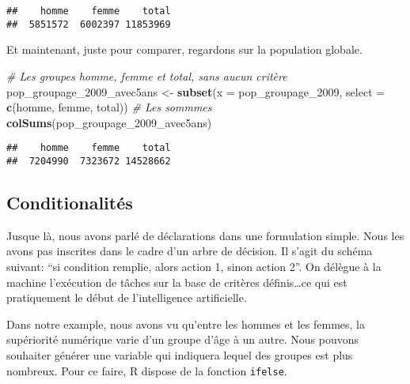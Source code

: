 \documentclass[]{book}
\newenvironment{Shaded}{\begin{snugshade}}{\end{snugshade}}
\newcommand{\KeywordTok}[1]{\textcolor[rgb]{0.13,0.29,0.53}{\textbf{#1}}}
\newcommand{\DataTypeTok}[1]{\textcolor[rgb]{0.13,0.29,0.53}{#1}}
\newcommand{\DecValTok}[1]{\textcolor[rgb]{0.00,0.00,0.81}{#1}}
\newcommand{\StringTok}[1]{\textcolor[rgb]{0.31,0.60,0.02}{#1}}
\newcommand{\CommentTok}[1]{\textcolor[rgb]{0.56,0.35,0.01}{\textit{#1}}}
\newcommand{\OperatorTok}[1]{\textcolor[rgb]{0.81,0.36,0.00}{\textbf{#1}}}
\newcommand{\NormalTok}[1]{#1}
\begin{document}
\begin{verbatim}
##    homme    femme    total 
##  5851572  6002397 11853969
\end{verbatim}

Et maintenant, juste pour comparer, regardons sur la population globale.

\begin{Shaded}
\begin{Highlighting}[]
\CommentTok{# Les groupes homme, femme et total, sans aucun critère}
\NormalTok{pop_groupage_2009_avec5ans <-}\StringTok{ }\KeywordTok{subset}\NormalTok{(}\DataTypeTok{x =}\NormalTok{ pop_groupage_}\DecValTok{2009}\NormalTok{, }\DataTypeTok{select =} \KeywordTok{c}\NormalTok{(homme, femme, total))}
\CommentTok{# Les sommmes}
\KeywordTok{colSums}\NormalTok{(pop_groupage_2009_avec5ans)}
\end{Highlighting}
\end{Shaded}

\begin{verbatim}
##    homme    femme    total 
##  7204990  7323672 14528662
\end{verbatim}

\subsection{Conditionalités}\label{conditionalites}

Jusque là, nous avons parlé de déclarations dans une formulation simple.
Nous les avons pas inscrites dans le cadre d'un arbre de décision. Il
s'agit du schéma suivant: ``si condition remplie, alors action 1, sinon
action 2''. On délègue à la machine l'exécution de tâches sur la base de
critères définis\ldots{}ce qui est pratiquement le début de
l'intelligence artificielle.

Dans notre example, nous avons vu qu'entre les hommes et les femmes, la
supériorité numérique varie d'un groupe d'âge à un autre. Nous pouvons
souhaiter générer une variable qui indiquera lequel des groupes est plus
nombreux. Pour ce faire, R dispose de la fonction \texttt{ifelse}.

\begin{Shaded}
\end{Shaded}
\end{document}
